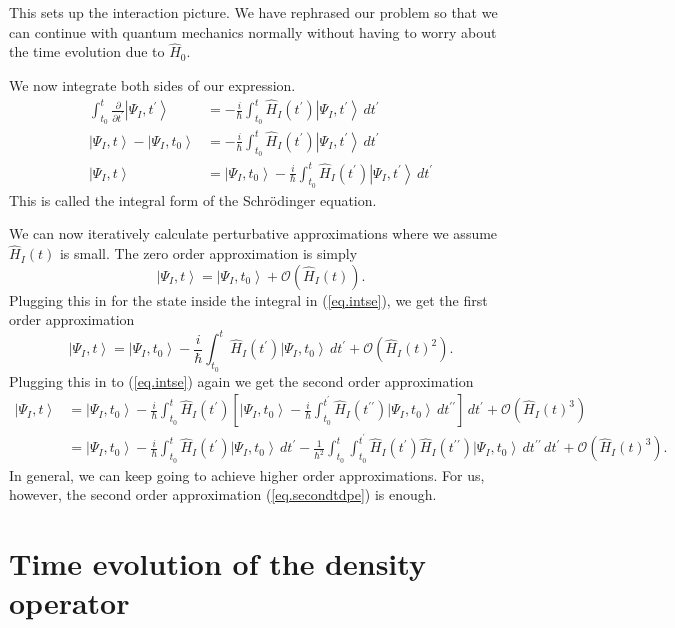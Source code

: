 \documentclass[11pt]{article}
\newcommand{\Od}[1]{\mathcal{O}{\left(#1\right)}}
\newcommand{\ket}[1]{\left|#1\right\rangle}
\newcommand{\op}[1]{\hat{#1}}
\theoremstyle{theorem}
\theoremstyle{remark}
\theoremstyle{step}
\theoremstyle{gap}
\begin{document}
This sets up the interaction picture. We have rephrased our problem so that we can continue with quantum mechanics normally without having to worry about the time evolution due to \(\op{H}_0\).

We now integrate both sides of our expression.
\begin{align}
\int_{t_0}^t \frac{\partial}{\partial t^\prime} \ket{\Psi_I, t^\prime} &= -\frac{i}{\hbar} \int_{t_0}^t \op{H}_I(t^\prime)\ket{\Psi_I, t^\prime} \,dt^\prime \nonumber\\
\ket{\Psi_I, t} - \ket{\Psi_I, t_0} &= -\frac{i}{\hbar} \int_{t_0}^t \op{H}_I(t^\prime)\ket{\Psi_I, t^\prime} \,dt^\prime \nonumber\\
\ket{\Psi_I, t} &= \ket{\Psi_I, t_0} - \frac{i}{\hbar} \int_{t_0}^t \op{H}_I(t^\prime)\ket{\Psi_I, t^\prime} \,dt^\prime \label{eq.intse}
\end{align}
This is called the integral form of the Schr\"odinger equation.

We can now iteratively calculate perturbative approximations where we assume \(\op{H}_I(t)\) is small. The zero order approximation is simply
\[\ket{\Psi_I, t} = \ket{\Psi_I, t_0} + \Od{\op{H}_I(t)}.\]
Plugging this in for the state inside the integral in (\ref{eq.intse}), we get the first order approximation
\begin{equation}\label{eq.firsttdpe}
\ket{\Psi_I, t} = \ket{\Psi_I, t_0} - \frac{i}{\hbar} \int_{t_0}^t \op{H}_I(t^\prime)\ket{\Psi_I, t_0} \,dt^\prime + \Od{\op{H}_I(t)^2}.
\end{equation}
Plugging this in to (\ref{eq.intse}) again we get the second order approximation
\begin{align}\nonumber
\ket{\Psi_I, t} &= \ket{\Psi_I, t_0} - \frac{i}{\hbar} \int_{t_0}^t \op{H}_I(t^\prime)\left[\ket{\Psi_I, t_0} - \frac{i}{\hbar} \int_{t_0}^{t^\prime} \op{H}_I(t^{\prime\prime})\ket{\Psi_I, t_0} \,dt^{\prime\prime}\right] \,dt^\prime + \Od{\op{H}_I(t)^3} \\
&= \ket{\Psi_I, t_0} - \frac{i}{\hbar}\int_{t_0}^t \op{H}_I (t^\prime) \ket{\Psi_I, t_0}\,dt^\prime - \frac{1}{\hbar^2} \int_{t_0}^t \int_{t_0}^{t^\prime} \op{H}_I(t^\prime) \op{H}_I(t^{\prime\prime})\ket{\Psi_I, t_0} \,dt^{\prime\prime}\,dt^\prime + \Od{\op{H}_I(t)^3}.
\label{eq.secondtdpe}\end{align}
In general, we can keep going to achieve higher order approximations. For us, however, the second order approximation (\ref{eq.secondtdpe}) is enough.


\section{Time evolution of the density operator}
\end{document}

